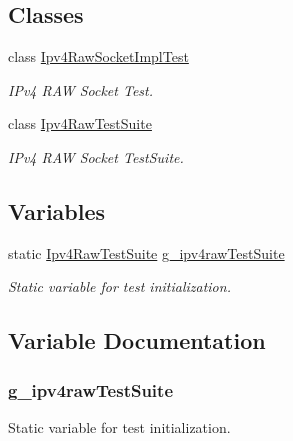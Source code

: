\subsection*{Classes}
\begin{DoxyCompactItemize}
\item 
class \hyperlink{classIpv4RawSocketImplTest}{Ipv4\+Raw\+Socket\+Impl\+Test}
\begin{DoxyCompactList}\small\item\em I\+Pv4 R\+AW Socket Test. \end{DoxyCompactList}\item 
class \hyperlink{classIpv4RawTestSuite}{Ipv4\+Raw\+Test\+Suite}
\begin{DoxyCompactList}\small\item\em I\+Pv4 R\+AW Socket Test\+Suite. \end{DoxyCompactList}\end{DoxyCompactItemize}
\subsection*{Variables}
\begin{DoxyCompactItemize}
\item 
static \hyperlink{classIpv4RawTestSuite}{Ipv4\+Raw\+Test\+Suite} \hyperlink{ipv4-raw-test_8cc_a933195fa196dde65ba14c7ebffbfb783}{g\+\_\+ipv4raw\+Test\+Suite}
\begin{DoxyCompactList}\small\item\em Static variable for test initialization. \end{DoxyCompactList}\end{DoxyCompactItemize}


\subsection{Variable Documentation}
\subsubsection[{\texorpdfstring{g\+\_\+ipv4raw\+Test\+Suite}{g_ipv4rawTestSuite}}]{ g\+\_\+ipv4raw\+Test\+Suite\hspace{0.3cm}{\ttfamily [static]}}\hypertarget{ipv4-raw-test_8cc_a933195fa196dde65ba14c7ebffbfb783}{}\label{ipv4-raw-test_8cc_a933195fa196dde65ba14c7ebffbfb783}


Static variable for test initialization. 

